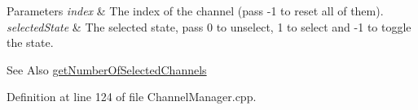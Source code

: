 \begin{DoxyParams}{Parameters}
{\em index} & The index of the channel (pass -\/1 to reset all of them). \\
\hline
{\em selected\-State} & The selected state, pass 0 to unselect, 1 to select and -\/1 to toggle the state. \\
\hline
\end{DoxyParams}
\begin{DoxySeeAlso}{See Also}
\hyperlink{class_hoa2_d_1_1_channel_manager_a0f33fda180a50a3b2a144d62801b0f56}{get\-Number\-Of\-Selected\-Channels} 
\end{DoxySeeAlso}


Definition at line 124 of file Channel\-Manager.\-cpp.

